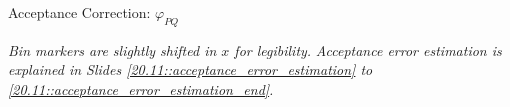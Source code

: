 \begin{frame}{Acceptance Correction: $\varphi_{PQ}$}
    \begin{flushright}
        \tiny{\textit{Bin markers are slightly shifted in $x$ for legibility.}}
        \tiny{\textit{Acceptance error estimation is explained in Slides \textcolor{efd_purple}{\ref{20.11::acceptance_error_estimation}} to \textcolor{efd_purple}{\ref{20.11::acceptance_error_estimation_end}}.}}
    \end{flushright}
\end{frame}
